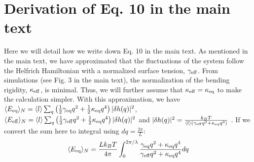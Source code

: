 \documentclass[amsmath,preprintnumbers,10pt,nofootinbib,prl,twocolumn]{revtex4-1}
\begin{document}
\section{Derivation of Eq. 10 in the main text}
Here we will detail how we write down Eq. 10 in the main text. As mentioned in the main text, we have approximated that the fluctuations of the system follow the Helfrich Hamiltonian with a normalized surface tension, $\gamma_{\rm eff}$. From simulations (see Fig. 3 in the main text), the normalization of the bending rigidity, $\kappa_{\rm eff}$, is minimal. Thus, we will further assume that $\kappa_{\rm eff} = \kappa_{\rm eq}$ to make the calculation simpler. With this approximation, we have $\langle E_{\rm eq}\rangle _N=\langle l \rangle\sum_q\left(\frac{1}{2}\gamma_{\rm eq} q^2+\frac{1}{2}\kappa_{\rm eq} q^4\right)|\delta h(q)|^2$, $\langle E_{\rm eff}\rangle_N=\langle l \rangle\sum_q\left(\frac{1}{2}\gamma_{\rm eff} q^2+\frac{1}{2}\kappa_{\rm eq} q^4\right)|\delta h(q)|^2$ and $|\delta h(q)|^2=\frac{k_B T}{\langle l \rangle  \left(\gamma_{\rm eff}q^2+\kappa_{\rm eq}q^3\right)}$ . If we convert the sum here to integral using $dq=\frac{2\pi}{L}$:
\begin{equation}
    \langle E_{\rm eq}\rangle_N=\frac{L k_BT}{4\pi}\int_0^{2\pi/\lambda}\frac{\gamma_{\rm eq}q^2+\kappa_{\rm eq}q^4}{\gamma_{\rm eff}q^2+\kappa_{\rm eq}q^4}dq
\end{equation}
\end{document}
